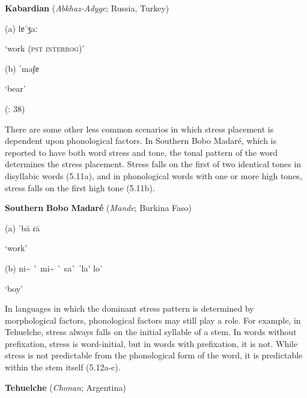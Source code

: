 \ea\label{ex:(5.10)}
  \textbf{Kabardian} (\textit{Abkhaz-Adyge}; Russia, Turkey)



(a)   lɐˈʒaː



‘work (\textsc{pst} \textsc{interrog})’



(b)  ˈməʃɐ



‘bear’



(\citealt{GordonApplebaum2010}: 38)


\z

  There are some other less common scenarios in which stress placement is dependent upon phonological factors. In Southern Bobo Madaré, which is reported to have both word stress and tone, the tonal pattern of the word determines the stress placement. Stress falls on the first of two identical tones in disyllabic words (5.11a), and in phonological words with one or more high tones, stress falls on the first high tone (5.11b).



\ea\label{ex:(5.11)}
  \textbf{Southern} \textbf{Bobo} \textbf{Madaré} (\textit{Mande}; Burkina Faso)



(a)  \textsf{ˈ}ba\textsf{\={} }ɾa\textsf{\={} }



‘work’



(b)  ni\~{} \`{} mi\~{} \`{} sa\`{} ˈla\'{} lo\`{} 



‘boy’



\citep[110]{Morse1976}

\z


  In languages in which the dominant stress pattern is determined by morphological factors, phonological factors may still play a role. For example, in Tehuelche, stress always falls on the initial syllable of a stem. In words without prefixation, stress is word-initial, but in words with prefixation, it is not. While stress is not predictable from the phonological form of the word, it is predictable within the stem itself (5.12a-c).



\ea\label{ex:(5.12)}
  \textbf{Tehuelche} (\textit{Chonan}; Argentina)



